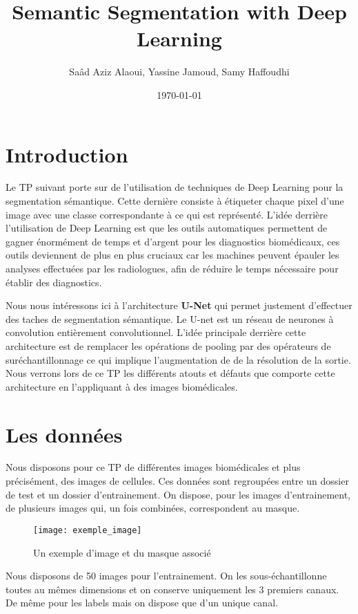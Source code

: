 \documentclass[12pt,a4paper,titlepage]{article}
\title{Semantic Segmentation with Deep Learning}
\author{Saâd Aziz Alaoui, Yassine Jamoud, Samy Haffoudhi}
\date{\today}
\begin{document}
\maketitle

\section*{Introduction}

Le TP suivant porte sur de l'utilisation de techniques de Deep Learning pour la segmentation
sémantique. Cette dernière consiste à étiqueter chaque pixel d’une image avec une classe
correspondante à ce qui est représenté. L'idée derrière l'utilisation de Deep Learning est que
les outils automatiques permettent de gagner énormément de temps et d'argent pour les diagnostics
biomédicaux, ces outils deviennent de plus en plus cruciaux car les machines peuvent épauler
les analyses effectuées par les radiologues, afin de réduire le temps nécessaire pour établir
des diagnostics.

Nous nous intéressons ici à l'architecture \textbf{U-Net} qui permet justement d'effectuer
des taches de segmentation sémantique. Le U-net est un réseau de neurones à convolution entièrement
convolutionnel. L'idée principale derrière cette architecture est de remplacer les opérations
de pooling par des opérateurs de suréchantillonnage ce qui implique l'augmentation de de la
résolution de la sortie. Nous verrons lors de ce TP les différents atouts et défauts que comporte
cette architecture en l'appliquant à des images biomédicales.

\section{Les données}

Nous disposons pour ce TP de différentes images biomédicales et plus précisément, des
images de cellules. Ces données sont regroupées entre un dossier de test et un dossier
d'entrainement. On dispose, pour les images d'entrainement, de plusieurs images qui, un
fois combinées, correspondent au masque.

\begin{figure}[H]
    \caption{Un exemple d'image et du masque associé}
    \texttt{[image: exemple\_image]}
    \centering
\end{figure}

Nous disposons de 50 images pour l'entrainement. On les sous-échantillonne toutes
au mêmes dimensions et on conserve uniquement les 3 premiers canaux. De même pour
les labels mais on dispose que d'un unique canal.
\end{document}
